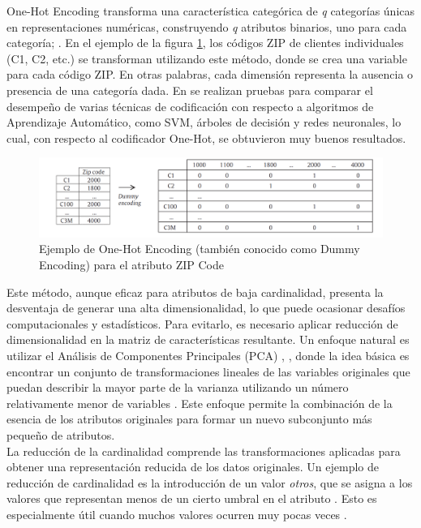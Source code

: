 One-Hot Encoding transforma una característica categórica de \textit{q} categorías únicas en representaciones numéricas, construyendo \textit{q} atributos binarios, uno para cada categoría; \citep{avanzi2023machine}. En el ejemplo de la figura \ref{fig:one-hot-ejemplo}, los códigos ZIP de clientes individuales (C1, C2, etc.) se transforman utilizando este método, donde se crea una variable  para cada código ZIP.
En otras palabras, cada dimensión representa la ausencia o presencia de una categoría dada. En \citep{hooi2022feature} se realizan pruebas para comparar el desempeño de varias técnicas de codificación con respecto a algoritmos de Aprendizaje Automático, como SVM, árboles de decisión y redes neuronales, lo cual, con respecto al codificador One-Hot, se obtuvieron muy buenos resultados. \\
\begin{figure}[H]
	\centering
	\includegraphics[width=0.8\linewidth]{"figuras/capi 1/one-hot-ejemplo"}
	\caption{Ejemplo de One-Hot Encoding (también conocido como Dummy Encoding) para el atributo ZIP Code}
	\label{fig:one-hot-ejemplo}
\end{figure}
Este método, aunque eficaz para atributos de baja cardinalidad, presenta la desventaja de generar una alta dimensionalidad, lo que puede ocasionar desafíos computacionales y estadísticos. Para evitarlo, es necesario aplicar reducción de dimensionalidad en la matriz de características resultante. Un enfoque natural es utilizar el Análisis de Componentes Principales (PCA) \citep{mahmood2022accurate}, \citep{kasemtaweechok2021large} , donde la idea básica es encontrar un conjunto de transformaciones lineales de las variables originales que puedan describir la mayor parte de la varianza utilizando un número relativamente menor de variables \citep{garcia2015data}. Este enfoque permite la combinación de la esencia de los atributos originales para formar un nuevo subconjunto más pequeño de atributos. \\
 La reducción de la cardinalidad comprende las transformaciones aplicadas para obtener una representación reducida de los datos originales. Un ejemplo de reducción de cardinalidad es la introducción de un valor \textit{otros}, que se asigna a los valores que representan menos de un cierto umbral en el atributo \citep{casas2019data}. Esto es especialmente útil cuando muchos valores ocurren muy pocas veces \citep{ventevogel2020construction}.


